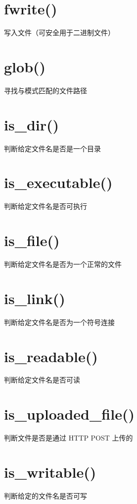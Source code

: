 \section{fwrite()}

写入文件（可安全用于二进制文件）

\section{glob()}

寻找与模式匹配的文件路径

\section{is\_dir()}

判断给定文件名是否是一个目录

\section{is\_executable()}

判断给定文件名是否可执行

\section{is\_file()}

判断给定文件名是否为一个正常的文件

\section{is\_link()}

判断给定文件名是否为一个符号连接

\section{is\_readable()}

判断给定文件名是否可读

\section{is\_uploaded\_file()}

判断文件是否是通过 HTTP POST 上传的

\section{is\_writable()}


判断给定的文件名是否可写

